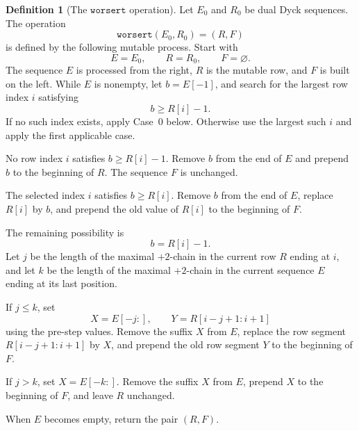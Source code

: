 \documentclass[11pt]{article}
\theoremstyle{plain}
\theoremstyle{definition}
\newtheorem{definition}[theorem]{Definition}
\theoremstyle{remark}
\newcommand{\worsert}{\texttt{worsert}}
\begin{document}
\begin{definition}[The \(\worsert\) operation]
\label{def:worsert}
Let \(E_0\) and \(R_0\) be dual Dyck sequences.  The operation
\[
  \worsert(E_0,R_0)=(R,F)
\]
is defined by the following mutable process.  Start with
\[
  E=E_0,
  \qquad R=R_0,
  \qquad F=\varnothing.
\]
The sequence \(E\) is processed from the right, \(R\) is the mutable row, and
\(F\) is built on the left.  While \(E\) is nonempty, let \(b=E[-1]\), and
search for the largest row index \(i\) satisfying
\[
  b\ge R[i]-1.
\]
If no such index exists, apply Case~0 below.  Otherwise use the largest such
\(i\) and apply the first applicable case.
\begin{description}[leftmargin=2.4cm,style=nextline]
\item[Case 0.] No row index \(i\) satisfies \(b\ge R[i]-1\).  Remove \(b\) from
the end of \(E\) and prepend \(b\) to the beginning of \(R\).  The sequence
\(F\) is unchanged.
\item[Case 1.] The selected index \(i\) satisfies \(b\ge R[i]\).  Remove \(b\)
from the end of \(E\), replace \(R[i]\) by \(b\), and prepend the old value of
\(R[i]\) to the beginning of \(F\).
\item[Equality branch.] The remaining possibility is
\[
  b=R[i]-1.
\]
Let \(j\) be the length of the maximal \(+2\)-chain in the current row \(R\)
ending at \(i\), and let \(k\) be the length of the maximal \(+2\)-chain in the
current sequence \(E\) ending at its last position.
\item[Case 2.] If \(j\le k\), set
\[
  X=E[-j:],\qquad Y=R[i-j+1:i+1]
\]
using the pre-step values.  Remove the suffix \(X\) from \(E\), replace the row
segment \(R[i-j+1:i+1]\) by \(X\), and prepend the old row segment \(Y\) to the
beginning of \(F\).
\item[Case 3.] If \(j>k\), set \(X=E[-k:]\).  Remove the suffix \(X\) from
\(E\), prepend \(X\) to the beginning of \(F\), and leave \(R\) unchanged.
\end{description}
When \(E\) becomes empty, return the pair \((R,F)\).
\end{definition}
\end{document}
